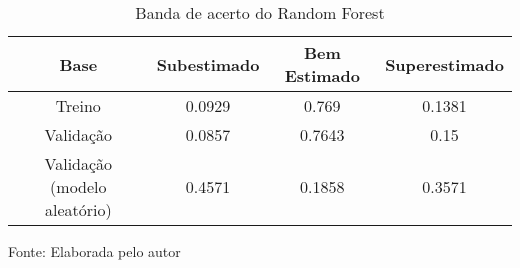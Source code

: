 
\begin{table}[h]
\centering
\caption{Banda de acerto do Random Forest}
\label{tab:cap3_band_random_forest}
\begin{tabular}{cccc}
Base & Subestimado & Bem Estimado & Superestimado \\
\hline
Treino & 0.0929 & 0.769 & 0.1381 \\
Validação & 0.0857 & 0.7643 & 0.15 \\
Validação (modelo aleatório) & 0.4571 & 0.1858 & 0.3571 \\
\hline
\end{tabular}

Fonte: Elaborada pelo autor
\end{table}
